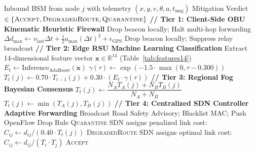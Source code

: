 \documentclass[conference]{IEEEtran}
\begin{document}
\begin{algorithm}[t]
\caption{EdgeTrust-VANET Multi-Tier Decision Workflow}
\label{alg:edgetrust}
\footnotesize
\begin{algorithmic}[1]
\REQUIRE Inbound BSM from node $j$ with telemetry $(x,y,v,\theta,a,t_{\text{msg}})$
\ENSURE Mitigation Verdict $\in \{\textsc{Accept}, \textsc{DegradedRoute}, \textsc{Quarantine}\}$
\STATE \textbf{// Tier 1: Client-Side OBU Kinematic Heuristic Firewall}
    \STATE Drop beacon locally; Halt multi-hop forwarding 
\ENDIF
\STATE $\Delta d_{\text{max}} \leftarrow v_{\text{last}}\Delta t + \frac{1}{2}a_{\text{max}}(\Delta t)^2 + \epsilon_{\text{GPS}}$
    \STATE Drop beacon locally; Suppress relay broadcast
\ENDIF
\STATE \textbf{// Tier 2: Edge RSU Machine Learning Classification}
    \STATE Extract 14-dimensional feature vector $\mathbf{x} \in \mathbb{R}^{14}$ (Table~\ref{tab:features14})
    \STATE $E_t \leftarrow \text{Inference}_{\text{AdaBoost}}(\mathbf{x})$ 
\ENDIF
\STATE $\gamma(\tau) \leftarrow \exp\left(-1.5 \cdot \max(0, \tau - 0.300)\right)$ 
\STATE $T_t(j) \leftarrow 0.70 \cdot T_{t-1}(j) + 0.30 \cdot (E_t \cdot \gamma(\tau))$
\STATE \textbf{// Tier 3: Regional Fog Bayesian Consensus}
    \STATE $T_t(j) \leftarrow \dfrac{N_A T_A(j) + N_B T_B(j)}{N_A + N_B}$
        \STATE $T_t(j) \leftarrow \min(T_A(j), T_B(j))$ 
    \ENDIF
\ENDIF
\STATE \textbf{// Tier 4: Centralized SDN Controller Adaptive Forwarding}
    \STATE Broadcast Road Safety Advisory; Blacklist MAC; Push OpenFlow Drop Rule
    \RETURN \textsc{Quarantine}
    \STATE SDN assigns penalized link cost: $C_{ij} \leftarrow d_{ij} / (0.40 \cdot T_t(j))$
    \RETURN \textsc{DegradedRoute}
\ELSE
    \STATE SDN assigns optimal link cost: $C_{ij} \leftarrow d_{ij} / (T_i \cdot T_j)$
    \RETURN \textsc{Accept}
\ENDIF
\end{algorithmic}
\end{algorithm}

\end{document}
